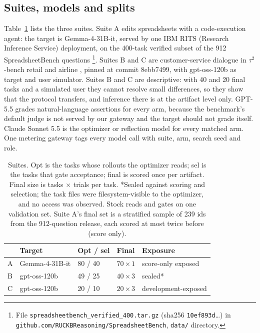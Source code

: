 \subsection{Suites, models and splits}

Table~\ref{tab:suites} lists the three suites. Suite A edits spreadsheets with a code-execution agent: the target is Gemma-4-31B-it, served by one IBM RITS (Research Inference Service) deployment, on the 400-task verified subset of the 912 SpreadsheetBench questions \citep{spreadsheetbench}\footnote{File \texttt{spreadsheetbench\_verified\_400.tar.gz} (sha256 \texttt{10ef893d}\ldots) in \texttt{github.com/RUCKBReasoning/SpreadsheetBench}, \texttt{data/} directory.}. Suites B and C are customer-service dialogue in $\tau^2$-bench retail and airline \citep{tau2-bench,tau_bench}, pinned at commit 8ebb7499, with gpt-oss-120b as target and user simulator. Suites B and C are descriptive: with 40 and 20 final tasks and a simulated user they cannot resolve small differences, so they show that the protocol transfers, and inference there is at the artifact level only. GPT-5.5 grades natural-language assertions for every arm, because the benchmark's default judge is not served by our gateway and the target should not grade itself. Claude Sonnet 5.5 is the optimizer or reflection model for every matched arm. One metering gateway tags every model call with suite, arm, search seed and role.

\begin{table}[t]
\caption{Suites. Opt is the tasks whose rollouts the optimizer reads; sel is the tasks that gate acceptance; final is scored once per artifact. Final size is tasks $\times$ trials per task. *Sealed against scoring and selection; the task files were filesystem-visible to the optimizer, and no access was observed. Stock \capevolve{} reads and gates on one validation set. Suite A's final set is a stratified sample of 239 ids from the 912-question release, each scored at most twice before (score only).}
\label{tab:suites}
\centering\small
\begin{tabularx}{\columnwidth}{@{}lXlll@{}}
\toprule
 & Target & Opt / sel & Final & Exposure \\
\midrule
A & Gemma-4-31B-it & 80 / 40 & $70\times 1$ & score-only exposed \\
B & gpt-oss-120b & 49 / 25 & $40\times 3$ & sealed* \\
C & gpt-oss-120b & 20 / 10 & $20\times 3$ & development-exposed \\
\bottomrule
\end{tabularx}
\end{table}

